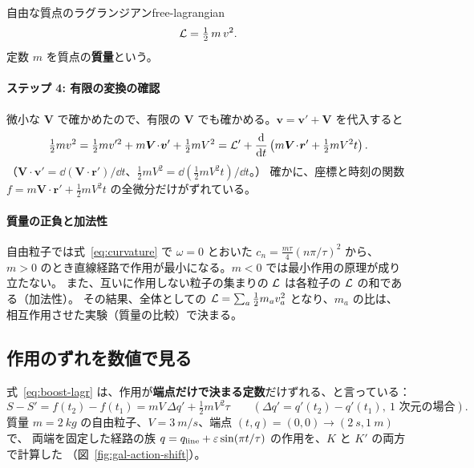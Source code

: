 \begin{result}{自由な質点のラグランジアン}{free-lagrangian}
\begin{equation}
  \mathcal{L}=\tfrac12\,m\,v^2 .
\end{equation}
定数 $m$ を質点の\textbf{質量}という。
\end{result}

\paragraph{ステップ 4: 有限の変換の確認}
微小な $\bm V$ で確かめたので、有限の $\bm V$ でも確かめる。$\bm v=\bm v'+\bm V$ を代入すると
\begin{equation}
  \tfrac12mv^2=\tfrac12mv'^2+m\bm V\!\cdot\!\bm v'+\tfrac12mV^2
  =\mathcal{L}'+\frac{\mathrm{d} }{\mathrm{d} t}\left(m\bm V\!\cdot\!\bm r'+\tfrac12mV^2t\right).
  \label{eq:boost-lagr}
\end{equation}
（$\bm V\cdot\bm v'=\dd(\bm V\cdot\bm r')/\dd t$、$\tfrac12mV^2=\dd(\tfrac12mV^2t)/\dd t$。）
確かに、座標と時刻の関数 $f=m\bm V\!\cdot\!\bm r'+\tfrac12mV^2t$ の全微分だけがずれている。

\paragraph{質量の正負と加法性}
自由粒子では式~\eqref{eq:curvature} で $\omega=0$ とおいた $c_n=\tfrac{m\tau}{4}(n\pi/\tau)^2$ から、
$m>0$ のとき直線経路で作用が最小になる。$m<0$ では最小作用の原理が成り立たない。
また、互いに作用しない粒子の集まりの $\mathcal{L}$ は各粒子の $\mathcal{L}$ の和である（加法性）。
その結果、全体としての $\mathcal{L}=\sum_a\tfrac12m_av_a^2$ となり、$m_a$ の比は、
相互作用させた実験（質量の比較）で決まる。

\subsection{作用のずれを数値で見る}

式~\eqref{eq:boost-lagr} は、作用が\textbf{端点だけで決まる定数}だけずれる、と言っている：
\begin{equation}
  S-S'=f(t_2)-f(t_1)=mV\,\Delta q'+\tfrac12mV^2\tau
  \qquad(\Delta q'=q'(t_2)-q'(t_1),\ \text{1 次元の場合}).
\end{equation}
質量 $m=\qty{2}{kg}$ の自由粒子、$V=\qty{3}{m/s}$、端点 $(t,q)=(0,0)\to(\qty{2}{s},\qty{1}{m})$ で、
両端を固定した経路の族 $q=q_{\rm line}+\varepsilon\sin(\pi t/\tau)$ の作用を、$K$ と $K'$ の両方で計算した
（図~\ref{fig:gal-action-shift}）。

